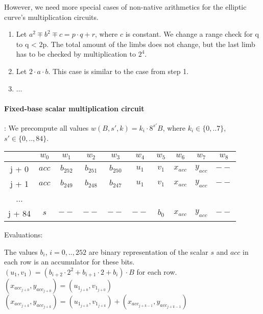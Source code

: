 However, we need more special cases of non-native arithmetics for the elliptic curve's multiplication circuits.
\begin{enumerate}
\item Let $a^2 \mp b^2 \mp c = p \cdot q + r$, where $c$ is constant. 
We change a range check for q to q < 2p.
The total amount of the limbs does not change, but the last limb has to be checked by multiplication to $2^4$.
\item Let $2 \cdot a \cdot b$.
This case is similar to the case from step 1.
\item ...
\end{enumerate}

\paragraph{Fixed-base scalar multiplication circuit}:
We precompute all values $w(B,s',k) = k_i \cdot 8^{s'} B$, where $k_i \in \{ 0,..7 \}$, $s' \in \{0,.., 84\}$.
\begin{center}
    \begin{tabular}{ c|c|c|c|c|c|c|c|c|c }
        & $w_0$  & $w_1$  & $w_2$  & $w_3$  & $w_4$  & $w_5$ & $w_6$ & $w_7$ & $w_8$  \\
        \hline
        j + 0  & $acc$  & $b_{252}$ & $b_{251}$ & $b_{250}$ & $u_1$ & $v_1$ & $x_{acc}$ & $y_{acc}$ & $--$   \\
        j + 1  & $acc$  & $b_{249}$ & $b_{248}$ & $b_{247}$ & $u_1$ & $v_1$ & $x_{acc}$ & $y_{acc}$ & $--$   \\
        ...    &             &             &             &             &      & & & &  \\
        j + 84 & $s$  & $--$ & $--$ & $--$ & $--$ & $b_{0}$ & $x_{acc}$ & $y_{acc}$ & $--$   \\
    \end{tabular}
\end{center}
Evaluations:
\begin{center}
The values $b_i$, $i = 0,.., 252$ are binary representation of the scalar $s$ and $acc$ in each row is an accumulator for these bits.\\
$(u_1, v_1) = (b_{i + 2} \cdot 2^2 + b_{i + 1}\cdot 2 + b_i) \cdot B$ for each row.\\
 $(x_{acc_{j + 0}}, y_{acc_{j + 0}}) = (u_{1_{j + 0}}, v_{1_{j + 0}}) $ \\
 $(x_{acc_{j + k}}, y_{acc_{j + k}}) = (u_{1_{j + k}}, v_{1_{j + k}}) + (x_{acc_{j + k - 1}}, y_{acc_{j + k - 1}}) $ \\
\end{center}

